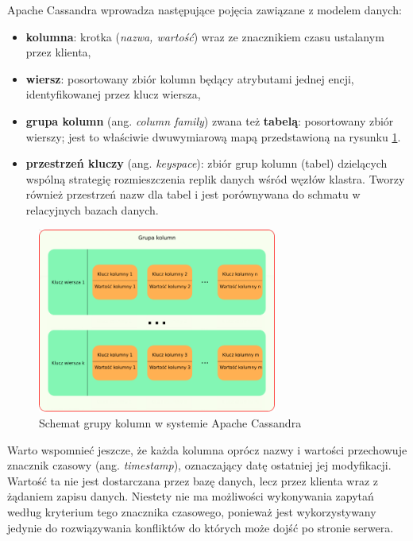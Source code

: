 Apache Cassandra wprowadza następujące pojęcia zawiązane z modelem danych:
\begin{itemize}
    \item \textbf{kolumna}: krotka (\textit{nazwa, wartość}) wraz ze znacznikiem czasu ustalanym przez klienta,
    \item \textbf{wiersz}: posortowany zbiór kolumn będący atrybutami jednej encji, identyfikowanej przez klucz wiersza,
    \item \textbf{grupa kolumn} (ang. \textit{column family}) zwana też \textbf{tabelą}: posortowany zbiór wierszy; jest to właściwie dwuwymiarową mapą przedstawioną na rysunku \ref{fig:cassandraColumnFamily}.
    \item \textbf{przestrzeń kluczy} (ang. \textit{keyspace}): zbiór grup kolumn (tabel) dzielących wspólną strategię rozmieszczenia replik danych wśród węzłów klastra. Tworzy również przestrzeń nazw dla tabel i jest porównywana do schmatu w relacyjnych bazach danych.
\end{itemize}

\begin{figure}[!ht]
\centering
\includegraphics[width=0.7\textwidth]{figures/casModel1.png}
\caption{Schemat grupy kolumn w systemie Apache Cassandra}
\label{fig:cassandraColumnFamily}
\end{figure}

Warto wspomnieć jeszcze, że każda kolumna oprócz nazwy i wartości przechowuje znacznik czasowy (ang. \textit{timestamp}), oznaczający datę ostatniej jej modyfikacji.
Wartość ta nie jest dostarczana przez bazę danych, lecz przez klienta wraz z żądaniem zapisu danych.
Niestety nie ma możliwości wykonywania zapytań według kryterium tego znacznika czasowego, ponieważ jest wykorzystywany jedynie do rozwiązywania konfliktów do których może dojść po stronie serwera.

